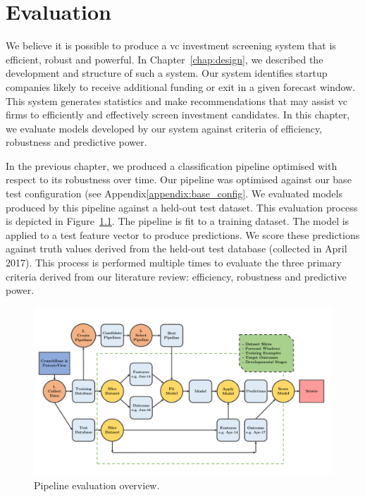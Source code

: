 \documentclass[../thesis/thesis.tex]{subfiles}
\begin{document}
\chapter{Evaluation}
\label{chap:evaluation}

We believe it is possible to produce a \gls{vc} investment screening system that is efficient, robust and powerful. In Chapter~\ref{chap:design}, we described the development and structure of such a system. Our system identifies startup companies likely to receive additional funding or exit in a given forecast window. This system generates statistics and make recommendations that may assist \gls{vc} firms to efficiently and effectively screen investment candidates. In this chapter, we evaluate models developed by our system against criteria of efficiency, robustness and predictive power.

In the previous chapter, we produced a classification pipeline optimised with respect to its robustness over time. Our pipeline was optimised against our base test configuration (see Appendix\ref{appendix:base_config}. We evaluated models produced by this pipeline against a held-out test dataset. This evaluation process is depicted in Figure~\ref{fig:evaluation:pipeline_evaluation}. The pipeline is fit to a training dataset. The model is applied to a test feature vector to produce predictions. We score these predictions against truth values derived from the held-out test database (collected in April 2017). This process is performed multiple times to evaluate the three primary criteria derived from our literature review: efficiency, robustness and predictive power.

\begin{figure}[!htb]
    \centering
    \includegraphics[width=\textwidth]{../figures/evaluation/flowchart_evaluation}
    \caption[Pipeline evaluation flowchart]{Pipeline evaluation overview.}
    \label{fig:evaluation:pipeline_evaluation}
\end{figure}
\end{document}
